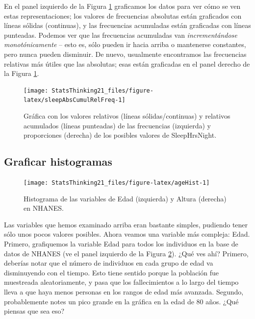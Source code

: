 \documentclass[
  12pt,
]{book}
\begin{document}
En el panel izquierdo de la Figura \ref{fig:sleepAbsCumulRelFreq} graficamos los datos para ver cómo se ven estas representaciones; los valores de frecuencias absolutas están graficados con líneas sólidas (continuas), y las frecuencias acumuladas están graficadas con líneas punteadas. Podemos ver que las frecuencias acumuladas van \emph{incrementándose monotónicamente} -- esto es, sólo pueden ir hacia arriba o mantenerse constantes, pero nunca pueden disminuir. De nuevo, usualmente encontramos las frecuencias relativas más útiles que las absolutas; esas están graficadas en el panel derecho de la Figura \ref{fig:sleepAbsCumulRelFreq}.

\begin{figure}
\texttt{[image: StatsThinking21\_files/figure-latex/sleepAbsCumulRelFreq-1]} \caption{Gráfica con los valores relativos (líneas sólidas/continuas) y relativos acumulados (líneas punteadas) de las frecuencias (izquierda) y proporciones (derecha) de los posibles valores de SleepHrsNight.}\label{fig:sleepAbsCumulRelFreq}
\end{figure}

\hypertarget{plotting-histograms}{%
\subsection{Graficar histogramas}\label{plotting-histograms}}

\begin{figure}
\texttt{[image: StatsThinking21\_files/figure-latex/ageHist-1]} \caption{Histograma de las variables de Edad (izquierda) y Altura (derecha) en NHANES.}\label{fig:ageHist}
\end{figure}

Las variables que hemos examinado arriba eran bastante simples, pudiendo tener sólo unos pocos valores posibles. Ahora veamos una variable más compleja: Edad. Primero, grafiquemos la variable Edad para todos los individuos en la base de datos de NHANES (ve el panel izquierdo de la Figura \ref{fig:ageHist}). ¿Qué ves ahí? Primero, deberías notar que el número de individuos en cada grupo de edad va disminuyendo con el tiempo. Esto tiene sentido porque la población fue muestreada aleatoriamente, y pasa que los fallecimientos a lo largo del tiempo lleva a que haya menos personas en los rangos de edad más avanzada. Segundo, probablemente notes un pico grande en la gráfica en la edad de 80 años. ¿Qué piensas que sea eso?
\end{document}
